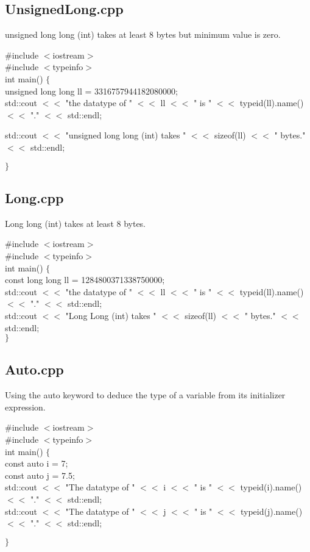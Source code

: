\documentclass[12pt]{report}
\begin{document}
\subsection{UnsignedLong.cpp}
\label{Appendix B: unsignedLong}
{\scriptsize unsigned long long (int) takes at least 8 bytes but minimum value is zero.}

{\scriptsize
\#include $<$iostream$>$ \\
\#include $<$typeinfo$>$ \\

int main() $\lbrace$\\
  unsigned long long ll = 3316757944182080000;\\

  std::cout $<<$ "the datatype of " $<<$ ll $<<$ " is " $<<$ typeid(ll).name() $<<$ "." $ <<$ std::endl;

  std::cout $<<$ "unsigned long long (int) takes " $<<$ sizeof(ll) $<<$ " bytes." $<<$ std::endl;

$\rbrace$
}
\subsection{Long.cpp}
\label{LongLong}
{\scriptsize Long long (int) takes at least 8 bytes.}

{\scriptsize
\#include $<$iostream$>$\\
\#include $<$typeinfo$>$\\

int main() $\lbrace$\\
  const long long ll = 1284800371338750000;\\

std::cout $<<$ "the datatype of " $<<$ ll $<<$ " is " $<<$ typeid(ll).name() $<<$ "." $ <<$ std::endl;\\
std::cout $<<$ "Long Long (int) takes " $<<$ sizeof(ll) $<<$ " bytes." $<<$ std::endl;\\
$\rbrace$
}

\subsection{Auto.cpp}
\label{Auto}
{\scriptsize Using the auto keyword to deduce the type of a variable from its initializer expression.}

{\scriptsize
\#include $<$iostream$>$\\
\#include $<$typeinfo$>$\\

int main() $\lbrace$\\
  const auto i = 7;\\
  const auto j = 7.5;\\

  std::cout $<<$ "The datatype of  " $<<$ i $<<$ " is " $<<$ typeid(i).name() $<<$ "." $<<$ std::endl;\\
  std::cout $<<$ "The datatype of  " $<<$ j $<<$ " is " $<<$ typeid(j).name() $<<$ "." $<<$ std::endl;

$\rbrace$
}
\end{document}
